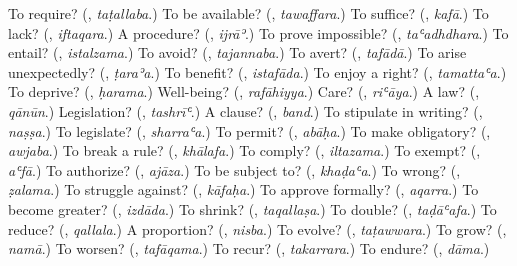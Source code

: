 \begin{tcolorbox}[breakable,colback=teal!4,colframe=teal!35!black,title={Before you move on}]
To require? (\textbf{}, \emph{taṭallaba}.) To be available? (\textbf{}, \emph{tawaffara}.) To suffice? (\textbf{}, \emph{kafā}.) To lack? (\textbf{}, \emph{iftaqara}.) A procedure? (\textbf{}, \emph{ijrāʾ}.) To prove impossible? (\textbf{}, \emph{taʿadhdhara}.) To entail? (\textbf{}, \emph{istalzama}.) To avoid? (\textbf{}, \emph{tajannaba}.) To avert? (\textbf{}, \emph{tafādā}.) To arise unexpectedly? (\textbf{}, \emph{ṭaraʾa}.) To benefit? (\textbf{}, \emph{istafāda}.) To enjoy a right? (\textbf{}, \emph{tamattaʿa}.) To deprive? (\textbf{}, \emph{ḥarama}.) Well-being? (\textbf{}, \emph{rafāhiyya}.) Care? (\textbf{}, \emph{riʿāya}.) A law? (\textbf{}, \emph{qānūn}.) Legislation? (\textbf{}, \emph{tashrīʿ}.) A clause? (\textbf{}, \emph{band}.) To stipulate in writing? (\textbf{}, \emph{naṣṣa}.) To legislate? (\textbf{}, \emph{sharraʿa}.) To permit? (\textbf{}, \emph{abāḥa}.) To make obligatory? (\textbf{}, \emph{awjaba}.) To break a rule? (\textbf{}, \emph{khālafa}.) To comply? (\textbf{}, \emph{iltazama}.) To exempt? (\textbf{}, \emph{aʿfā}.) To authorize? (\textbf{}, \emph{ajāza}.) To be subject to? (\textbf{}, \emph{khaḍaʿa}.) To wrong? (\textbf{}, \emph{ẓalama}.) To struggle against? (\textbf{}, \emph{kāfaḥa}.) To approve formally? (\textbf{}, \emph{aqarra}.) To become greater? (\textbf{}, \emph{izdāda}.) To shrink? (\textbf{}, \emph{taqallaṣa}.) To double? (\textbf{}, \emph{taḍāʿafa}.) To reduce? (\textbf{}, \emph{qallala}.) A proportion? (\textbf{}, \emph{nisba}.) To evolve? (\textbf{}, \emph{taṭawwara}.) To grow? (\textbf{}, \emph{namā}.) To worsen? (\textbf{}, \emph{tafāqama}.) To recur? (\textbf{}, \emph{takarrara}.) To endure? (\textbf{}, \emph{dāma}.)
\end{tcolorbox}
